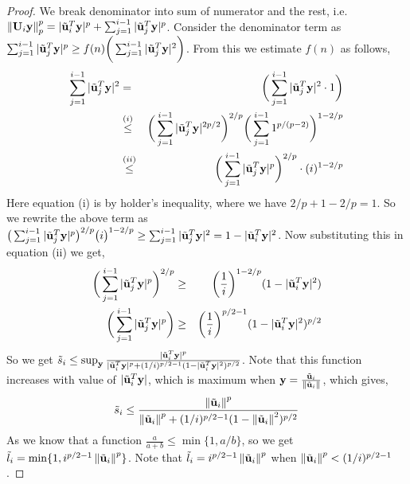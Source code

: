 \begin{proof}{\label{proof:onlineSensitivityBound}}
We break denominator into sum of numerator and the rest, i.e. $\left\lVert\mathbf{U}_{i}\mathbf{y}\right\rVert_{p}^{p} = \vert \tilde{\mathbf{u}}_{i}^{T}\mathbf{y}\vert^{p}+\sum_{j=1}^{i-1}\vert \tilde{\mathbf{u}}_{j}^{T}\mathbf{y}\vert^{p}$. %
% 
Consider the denominator term as $\sum_{j=1}^{i-1}|\tilde{\mathbf{u}}_{j}^{T}\mathbf{y}|^{p} \geq f(n)\bigg(\sum_{j=1}^{i-1} |\tilde{\mathbf{u}}_{j}^{T}\mathbf{y}|^{2}\bigg)$. From this we estimate $f(n)$ as follows,
\begin{eqnarray*}
\sum_{j=1}^{i-1}|\tilde{\mathbf{u}}_{j}^{T}\mathbf{y}|^{2} &=& \bigg(\sum_{j=1}^{i-1}|\tilde{\mathbf{u}}_{j}^{T}\mathbf{y}|^{2}\cdot 1\bigg) \nonumber \\
&\stackrel{(i)}{\leq}& \bigg(\sum_{j=1}^{i-1}|\tilde{\mathbf{u}}_{j}^{T}\mathbf{y}|^{2p/2}\bigg)^{2/p}\bigg(\sum_{j=1}^{i-1}1^{p/(p-2)}\bigg)^{1-2/p} \\
&\stackrel{(ii)}{\leq}& \bigg(\sum_{j=1}^{i-1}|\tilde{\mathbf{u}}_{j}^{T}\mathbf{y}|^{p}\bigg)^{2/p}\cdot(i)^{1-2/p}
\end{eqnarray*}
% 
Here equation (i) is by holder's inequality, where we have $2/p + 1 - 2/p = 1$. So we rewrite the above term as $\big(\sum_{j=1}^{i-1}|\tilde{\mathbf{u}}_{j}^{T}\mathbf{y}|^{p}\big)^{2/p} \big(i\big)^{1-2/p} \geq \sum_{j=1}^{i-1} |\tilde{\mathbf{u}}_{j}^{T}\mathbf{y}|^{2} = 1 - |\tilde{\mathbf{u}}_{i}^{T}\mathbf{y}|^{2}$. Now substituting this in equation (ii) we get,
\begin{eqnarray*}
\bigg(\sum_{j=1}^{i-1}|\tilde{\mathbf{u}}_{j}^{T}\mathbf{y}|^{p}\bigg)^{2/p} &\geq& \bigg(\frac{1}{i}\bigg)^{1-2/p} (1 - |\tilde{\mathbf{u}}_{i}^{T}\mathbf{y}|^{2})\\
\bigg(\sum_{j=1}^{i-1}|\tilde{\mathbf{u}}_{j}^{T}\mathbf{y}|^{p}\bigg) &\geq& \bigg(\frac{1}{i}\bigg)^{p/2-1}(1 - |\tilde{\mathbf{u}}_{i}^{T}\mathbf{y}|^{2})^{p/2}
\end{eqnarray*}
So we get $\tilde{s}_{i} \leq \sup_{\mathbf{y}}\frac{\vert \tilde{\mathbf{u}}_{i}^{T}\mathbf{y}\vert^{p}}{\vert \tilde{\mathbf{u}}_{i}^{T}\mathbf{y}\vert^{p}+(1/i)^{p/2-1}(1-\vert \tilde{\mathbf{u}}_{i}^{T}\mathbf{y}\vert^{2})^{p/2}}$. Note that this function increases with value of $|\tilde{\mathbf{u}}_{i}^{T}\mathbf{y}|$, which is maximum when $\mathbf{y} = \frac{\tilde{\mathbf{u}}_{i}}{\left\lVert\tilde{\mathbf{u}}_{i}\right\rVert}$, which gives,
\begin{equation}
 \tilde{s}_{i} \leq \frac{\left\lVert\tilde{\mathbf{u}}_{i}\right\rVert^{p}}{\left\lVert\tilde{\mathbf{u}}_{i}\right\rVert^{p} + (1/i)^{p/2-1}(1-\left\lVert\tilde{\mathbf{u}}_{i}\right\rVert^{2})^{p/2}} \nonumber
\end{equation}
As we know that a function $\frac{a}{a+b} \leq \min\{1,a/b\}$, so we get $\tilde{l}_{i} = \min\{1,i^{p/2-1}\left\lVert\tilde{\mathbf{u}}_{i}\right\rVert^{p}\}$. Note that $\tilde{l}_{i} = i^{p/2-1}\left\lVert\tilde{\mathbf{u}}_{i}\right\rVert^{p}$ when $\left\lVert\tilde{\mathbf{u}}_{i}\right\rVert^{p} < (1/i)^{p/2-1}$.
\end{proof}
